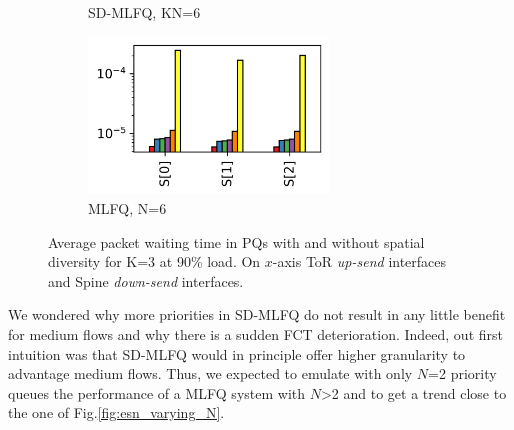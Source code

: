 \begin{figure}[!tb]
\begin{subfigure}{.5\textwidth}
		\caption{SD-MLFQ, KN=6}
		\label{fig:strict-priority-inversion-sdmlfq}
	\end{subfigure}%
	\hfill
	\begin{subfigure}{.5\textwidth}
		\centering
		\includegraphics[width=0.7\textwidth]{Chapter4/Figures/esn-sp-spine_3x2}
		\caption{MLFQ, N=6}
		\label{fig:strict-priority-mlfq}
	\end{subfigure}%
	\caption{Average packet waiting time in PQs with and without spatial diversity for K=3 at 90\% load. On $x$-axis ToR \textit{up-send} interfaces and Spine \textit{down-send} interfaces.}
	\label{fig:priority-queuing-time}
\end{figure}%
We wondered why more priorities in SD-MLFQ do not result in any little benefit for medium flows and why there is a sudden FCT deterioration. Indeed, out first intuition was that SD-MLFQ would in principle offer higher granularity to advantage medium flows. Thus, we expected to emulate with only $N$=2 priority queues the performance of a MLFQ system with $N$>2 and to get a trend close to the one of Fig.\ref{fig:esn_varying_N}.

